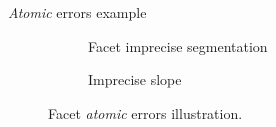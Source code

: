 \documentclass{beamer}
\begin{document}
\begin{frame}{\emph{Atomic} errors example}
{\begin{figure}
\begin{center}
\begin{subfigure}{.28\textwidth}
                            \end{subfigure}
                            \hspace{10pt}
                            \begin{subfigure}{.28\textwidth}
                                \caption{\label{fig::fac_footprint} Facet imprecise segmentation}
                            \end{subfigure}
                            \hspace{10pt}
                            \begin{subfigure}{.28\textwidth}
                                \caption{\label{fig::fac_height} Imprecise slope}
                            \end{subfigure}
                            \caption{Facet \emph{atomic} errors illustration.}
                        \end{center}
                    \end{figure}
                }
            \end{frame}
\end{document}
